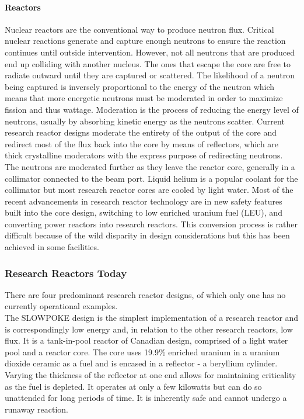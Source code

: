 \paragraph{Reactors}

Nuclear reactors are the conventional way to produce neutron flux. Critical nuclear reactions generate and capture enough neutrons to ensure the reaction continues until outside intervention. However, not all neutrons that are produced end up colliding with another nucleus. The ones that escape the core are free to radiate outward until they are captured or scattered. The likelihood of a neutron being captured is inversely proportional to the energy of the neutron which means that more energetic neutrons must be moderated in order to maximize fission and thus wattage. Moderation is the process of reducing the energy level of neutrons, usually by absorbing kinetic energy as the neutrons scatter. Current research reactor designs moderate the entirety of the output of the core and redirect most of the flux back into the core by means of reflectors, which are thick crystalline moderators with the express purpose of redirecting neutrons. The neutrons are moderated further as they leave the reactor core, generally in a collimator connected to the beam port. Liquid helium is a popular coolant for the collimator but most research reactor cores are cooled by light water. Most of the recent advancements in research reactor technology are in new safety features built into the core design, switching to low enriched uranium fuel (LEU), and converting power reactors into research reactors. This conversion process is rather difficult because of the wild disparity in design considerations but this has been achieved in some facilities.

\subsubsection{Research Reactors Today}

There are four predominant research reactor designs, of which only one has no currently operational examples.\\

The SLOWPOKE design is the simplest implementation of a research reactor and is correspondingly low energy and, in relation to the other research reactors, low flux. It is a tank-in-pool reactor of Canadian design, comprised of a light water pool and a reactor core. The core uses 19.9\% enriched uranium in a uranium dioxide ceramic as a fuel and is encased in a reflector - a beryllium cylinder. Varying the thickness of the reflector at one end allows for maintaining criticality as the fuel is depleted. It operates at only a few kilowatts but can do so unattended for long periods of time. It is inherently safe and cannot undergo a runaway reaction.\\

